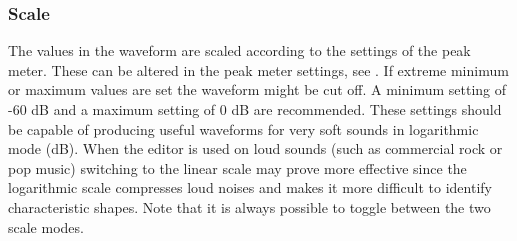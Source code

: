 \subsubsection{\label{ref:Scalemode}Scale}
The values in the waveform are scaled according to the settings of the
peak meter. These can be altered in the peak meter settings,
see . If extreme minimum or
maximum values are set the waveform might be cut off.  A minimum
setting of {}-60 dB and a maximum setting of 0 dB are recommended.
These settings should be capable of producing useful waveforms for very
soft sounds in logarithmic mode (dB). When the editor is used on loud
sounds (such as commercial rock or pop music) switching to the linear
scale may prove more effective since the logarithmic scale compresses
loud noises and makes it more difficult to identify characteristic
shapes. Note that it is always possible to toggle between the two scale
modes.


